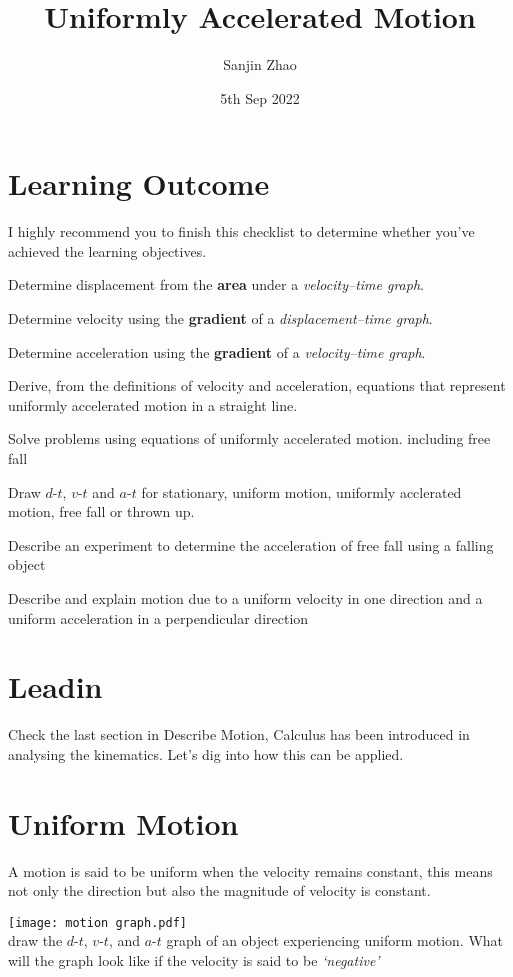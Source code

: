 \documentclass[a4paper]{tufte-handout}
\title{Uniformly Accelerated Motion}
\author{Sanjin Zhao}
\date{5th Sep 2022}  %
\newenvironment{TaskBox} %
{\begin{tcolorbox}[breakable,colback=b1!30,colframe=b1,title=Task]} {\end{tcolorbox}}
\begin{document}
\maketitle%
\section*{Learning Outcome}
I highly recommend you to finish this checklist to determine whether you've achieved the learning objectives.
\begin{todolist}
  \item Determine displacement from the \textbf{area} under a \emph{velocity–time graph}.
  \item Determine velocity using the \textbf{gradient} of a \emph{displacement–time graph}.
  \item Determine acceleration using the \textbf{gradient} of a \emph{velocity–time graph}.
  \item Derive, from the definitions of velocity and acceleration, equations that represent uniformly accelerated motion in a straight line.
  \item Solve problems using equations of uniformly accelerated motion. including free fall
  \item Draw $d$-$t$, $v$-$t$ and $a$-$t$ for stationary, uniform motion, uniformly acclerated motion, free fall or thrown up. 
  \item Describe an experiment to determine the acceleration of free fall using a falling object
  \item Describe and explain motion due to a uniform velocity in one direction and a uniform acceleration in a perpendicular direction
\end{todolist}
\clearpage

\section*{Leadin}
Check the last section in Describe Motion, Calculus has been introduced in analysing the kinematics. Let's dig into how this can be applied.

\section{Uniform Motion}
A motion is said to be uniform when the velocity remains constant, this means not only the direction but also the magnitude of velocity is constant.
\begin{TaskBox}
\texttt{[image: motion graph.pdf]}\\
draw the $d$-$t$, $v$-$t$, and $a$-$t$ graph of an object experiencing uniform motion.
\tcblower
What will the graph look like if the velocity is said to be \emph{`negative'}
\end{TaskBox}
\end{document}
